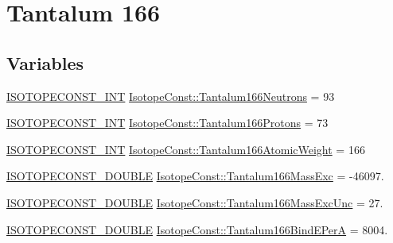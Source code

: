 \hypertarget{group___isotope_const-_tantalum-_ta166}{}\section{Tantalum 166}
\label{group___isotope_const-_tantalum-_ta166}
\subsection*{Variables}
\begin{DoxyCompactItemize}
\item 
\mbox{\hyperlink{group___isotope_const-_macros_ga5f18360b3e99483a35c32d789e62621c}{I\+S\+O\+T\+O\+P\+E\+C\+O\+N\+S\+T\+\_\+\+I\+NT}} \mbox{\hyperlink{group___isotope_const-_tantalum-_ta166_gab0aa57173f3ecf04b7bcfd99d4b43d21}{Isotope\+Const\+::\+Tantalum166\+Neutrons}} = 93
\item 
\mbox{\hyperlink{group___isotope_const-_macros_ga5f18360b3e99483a35c32d789e62621c}{I\+S\+O\+T\+O\+P\+E\+C\+O\+N\+S\+T\+\_\+\+I\+NT}} \mbox{\hyperlink{group___isotope_const-_tantalum-_ta166_gaa55259116795b3a73a749ee8d76afbcc}{Isotope\+Const\+::\+Tantalum166\+Protons}} = 73
\item 
\mbox{\hyperlink{group___isotope_const-_macros_ga5f18360b3e99483a35c32d789e62621c}{I\+S\+O\+T\+O\+P\+E\+C\+O\+N\+S\+T\+\_\+\+I\+NT}} \mbox{\hyperlink{group___isotope_const-_tantalum-_ta166_ga430aa63165c42d64f75bbf48cd47f1e2}{Isotope\+Const\+::\+Tantalum166\+Atomic\+Weight}} = 166
\item 
\mbox{\hyperlink{group___isotope_const-_macros_ga8f45a7272ce02c0b4c65c44636ed719a}{I\+S\+O\+T\+O\+P\+E\+C\+O\+N\+S\+T\+\_\+\+D\+O\+U\+B\+LE}} \mbox{\hyperlink{group___isotope_const-_tantalum-_ta166_ga7f650950966f033345db8e5718199d5e}{Isotope\+Const\+::\+Tantalum166\+Mass\+Exc}} = -\/46097.
\item 
\mbox{\hyperlink{group___isotope_const-_macros_ga8f45a7272ce02c0b4c65c44636ed719a}{I\+S\+O\+T\+O\+P\+E\+C\+O\+N\+S\+T\+\_\+\+D\+O\+U\+B\+LE}} \mbox{\hyperlink{group___isotope_const-_tantalum-_ta166_ga9df20a10465fc12960819320b108d27e}{Isotope\+Const\+::\+Tantalum166\+Mass\+Exc\+Unc}} = 27.
\item 
\mbox{\hyperlink{group___isotope_const-_macros_ga8f45a7272ce02c0b4c65c44636ed719a}{I\+S\+O\+T\+O\+P\+E\+C\+O\+N\+S\+T\+\_\+\+D\+O\+U\+B\+LE}} \mbox{\hyperlink{group___isotope_const-_tantalum-_ta166_gad7b88b0d78c0e200b7203f70dbc88d91}{Isotope\+Const\+::\+Tantalum166\+Bind\+E\+PerA}} = 8004.
\item 

\end{DoxyCompactItemize}
